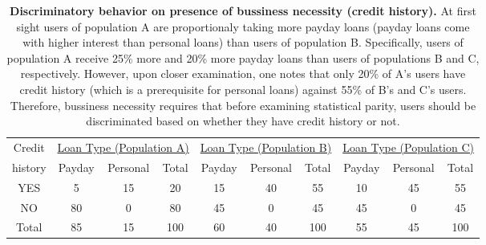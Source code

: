 \begin{table*}[t]
{ \small
  \center
  \renewcommand{\arraystretch}{1.5}
  \begin{tabular}{ c | c c c | c c c | c c c}
    Credit
    & \multicolumn{3}{|c|}{\underline{Loan Type (Population A)}}
    & \multicolumn{3}{|c}{\underline{Loan Type (Population B) }}
    & \multicolumn{3}{|c}{\underline{Loan Type (Population C) }} \\
    history & Payday & Personal & Total & Payday & Personal & Total & Payday & Personal & Total \\
    \hline
    YES & 5  & 15 & 20 & 15 & 40 & 55 & 10 & 45 & 55 \\
    NO  & 80 & 0  & 80 & 45 & 0 & 45 & 45 & 0 & 45\\
    \hline
    Total & 85 & 15 & 100 & 60 & 40 & 100 & 55 & 45 & 100\\
  \end{tabular}
  \label{tab:BusinessNessecity}
  \caption{{\bf Discriminatory behavior on presence of bussiness necessity (credit history).}
  At first sight users of population A are proportionaly taking more payday loans
  (payday loans come with higher interest than personal loans) than users of population B.
  Specifically, users of population A receive 25\% more and 20\% more  payday loans than
  users of populations B and C, respectively. However, upon closer examination, one notes
  that only 20\% of A's users have credit history (which is a prerequisite for personal
  loans) against 55\% of B's and C's users. Therefore, bussiness necessity requires that
  before examining statistical parity, users should be discriminated based on whether
  they have credit history or not.}
}
\end{table*}
